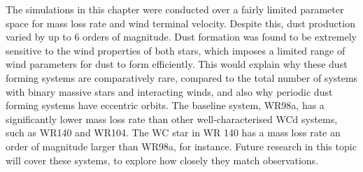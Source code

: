 The simulations in this chapter were conducted over a fairly limited parameter space for mass loss rate and wind terminal velocity.
Despite this, dust production varied by up to 6 orders of magnitude.
Dust formation was found to be extremely sensitive to the wind properties of both stars, which imposes a limited range of wind parameters for dust to form efficiently.
This would explain why these dust forming systems are comparatively rare, compared to the total number of systems with binary massive stars and interacting winds, and also why periodic dust forming systems have eccentric orbits.
The baseline system, WR98a, has a significantly lower mass loss rate than other well-characterised WCd systems, such as WR140 and WR104.
The WC star in WR 140 has a mass loss rate an order of magnitude larger than WR98a, for instance.
Future research in this topic will cover these systems,
to explore how closely they match observations.



